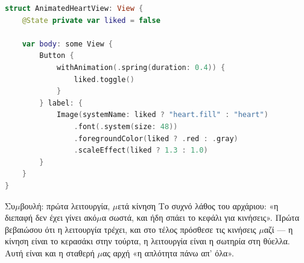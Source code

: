 \begin{lstlisting}[language=Swift]
struct AnimatedHeartView: View {
    @State private var liked = false

    var body: some View {
        Button {
            withAnimation(.spring(duration: 0.4)) {
                liked.toggle()
            }
        } label: {
            Image(systemName: liked ? "heart.fill" : "heart")
                .font(.system(size: 48))
                .foregroundColor(liked ? .red : .gray)
                .scaleEffect(liked ? 1.3 : 1.0)
        }
    }
}
\end{lstlisting}

\begin{tcbinfo}{Συ$\mu$βουλή: πρώτα λειτουργία, $\mu$ετά κίνηση}
Το συχνό λάθος του αρχάριου: «η διεπαφή δεν έχει γίνει ακό$\mu$α σωστά, και ήδη σπάει το κεφάλι για κινήσεις». Πρώτα βεβαιώσου ότι η λειτουργία τρέχει, και στο τέλος πρόσθεσε τις κινήσεις $\mu$αζί — η κίνηση είναι το κερασάκι στην τούρτα, η λειτουργία είναι η σωτηρία στη θύελλα. Αυτή είναι και η σταθερή $\mu$ας αρχή «η απλότητα πάνω απ' όλα».

\end{tcbinfo}

